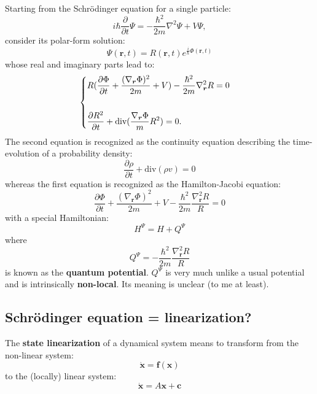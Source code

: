 \documentclass[orivec]{llncs}
\newcommand{\vect}[1]{\boldsymbol{#1}}
\begin{document}
Starting from the Schr\"odinger equation for a single particle:
\begin{equation}
i \hbar \frac{\partial}{\partial t} \Psi = - \frac{\hbar^2}{2 m} \nabla^2 \Psi + V \Psi ,
\end{equation}
consider its polar-form solution:
\begin{equation}
\Psi(\vect{r},t) = R(\vect{r},t) e^{\frac{i}{\hbar} \Phi(\vect{r},t)}
\end{equation}
whose real and imaginary parts lead to:
\begin{equation}
\begin{cases}
\displaystyle R(\frac{\partial \Phi}{\partial t} + \frac{(\nabla_{\vect{r}} \Phi)^2}{2 m} + V) -  \frac{\hbar^2}{2 m} \nabla_{\vect{r}}^2 R = 0 
\vspace{0.7cm} \\
\displaystyle \frac{\partial R^2}{\partial t} + \mbox{div} (\frac{\nabla_{\vect{r}} \Phi}{m} R^2) = 0 .
\end{cases}
\end{equation}
The second equation is recognized as the continuity equation describing the time-evolution of a probability density:
\begin{equation}
\frac{\partial \rho}{\partial t} + \mbox{div} (\rho v) = 0
\end{equation}
whereas the first equation is recognized as the Hamilton-Jacobi equation:
\begin{equation}
\displaystyle \frac{\partial \Phi}{\partial t} + \frac{(\nabla_{\vect{r}} \Phi)^2}{2 m} + V -  \frac{\hbar^2}{2 m} \frac{\nabla_{\vect{r}}^2 R}{R} = 0 
\end{equation}
with a special Hamiltonian:
\begin{equation}
H^\Psi = H + Q^\Psi
\end{equation}
where
\begin{equation}
Q^\Psi = - \frac{\hbar^2}{2 m} \frac{\nabla_{\vect{r}}^2 R}{R}
\end{equation}
is known as the \textbf{quantum potential}.  $Q^\Psi$ is very much unlike a usual potential and is intrinsically \textbf{non-local}.  Its meaning is unclear (to me at least).

\subsection{Schr\"odinger equation = linearization?}

The \textbf{state linearization} of a dynamical system means to transform from the non-linear system:
\begin{equation}
\dot{\vect{x}} = \vect{f}(\vect{x}) %
\end{equation}
to the (locally) linear system:
\begin{equation}
\dot{\vect{x}} = A \vect{x} + \vect{c} %
\end{equation}
\end{document}
